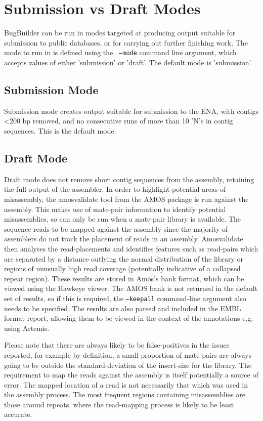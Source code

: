 \documentclass[a4paper,10pt]{article}
\begin{document}
\section{Submission vs Draft Modes}

BugBuilder can be run in modes targeted at producing output suitable for submission to public
databases, or for carrying out further finishing work. The mode to run in is defined using the {\tt
--mode} command line argument, which accepts values of either 'submission' or 'draft'. The
default mode is 'submission'.

\subsection{Submission Mode}

Submission mode creates output suitable for submission to the ENA, with contigs \textless200 bp removed,
and no consecutive runs of more than 10 'N's in contig sequences. This is the default mode. 

\subsection{Draft Mode}

Draft mode does not remove short contig sequences from the assembly, retaining
the full output of the assembler. In order to highlight potential areas of
misassembly, the amosvalidate tool from the AMOS package is run against the
assembly. This makes use of mate-pair information to identify potential
misassemblies, so can only be run when a mate-pair library is available. 
The sequence reads to be mapped against the assembly since the majority of
assemblers do not track the placement of reads in an assembly.  Amosvalidate
then analyses the read-placements and identifies features such as read-pairs
which are separated by a distance outlying the normal distribution of the
library or regions of unusually high read coverage (potentially indicative of a
collapsed repeat region). These results are stored in Amos's bank format, which
can be viewed using the Hawkeye viewer. The AMOS bank is not returned in the
default set of results, so if this is required, the {\tt --keepall}
command-line argument also needs to be specified. The results are also parsed
and included in the EMBL format report, allowing them to be viewed in the
context of the annotations e.g. using Artemis.

Please note that there are always likely to be false-positives in the issues
reported, for example by definition, a small proportion of mate-pairs are
always going to be outside the standard-deviation of the insert-size for the
library. The requirement to map the reads against the assembly is itself
potentially a source of error. The mapped location of a read is not necessarily
that which was used in the assembly process. The most frequent regions
containing misassemblies are those around repeats, where the read-mapping
process is likely to be least accurate. 
\end{document}

